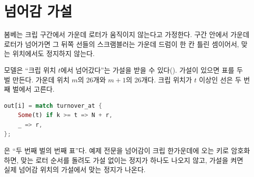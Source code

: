 \section{넘어감 가설}

봄베는 크립 구간에서 가운데 로터가 움직이지 않는다고 가정한다. 구간 안에서 가운데 로터가 넘어가면 그 뒤쪽
선들의 스크램블러는 가운데 드럼이 한 칸 틀린 셈이어서, 맞는 위치에서도 정지하지 않는다.

모델은 ``크립 위치 $t$에서 넘어갔다''는 가설을 받을 수 있다(). 가설이 있으면 표를 두 벌
만든다. 가운데 위치 $m$의 26개와 $m+1$의 26개다. 크립 위치가 $t$ 이상인 선은 두 번째 벌에서 고른다.

\begin{lstlisting}[language=Rust,numbers=none]
out[i] = match turnover_at {
    Some(t) if k >= t => N + r,
    _ => r,
};
\end{lstlisting}

은 ``두 번째 벌의 번째 표''다. 예제 전문을 넘어감이 크립 한가운데에 오는 키로 암호화하면,
맞는 로터 순서를 돌려도 가설 없이는 정지가 하나도 나오지 않고, 가설을 켜면 실제 넘어감 위치의 가설에서
맞는 정지가 나온다.
